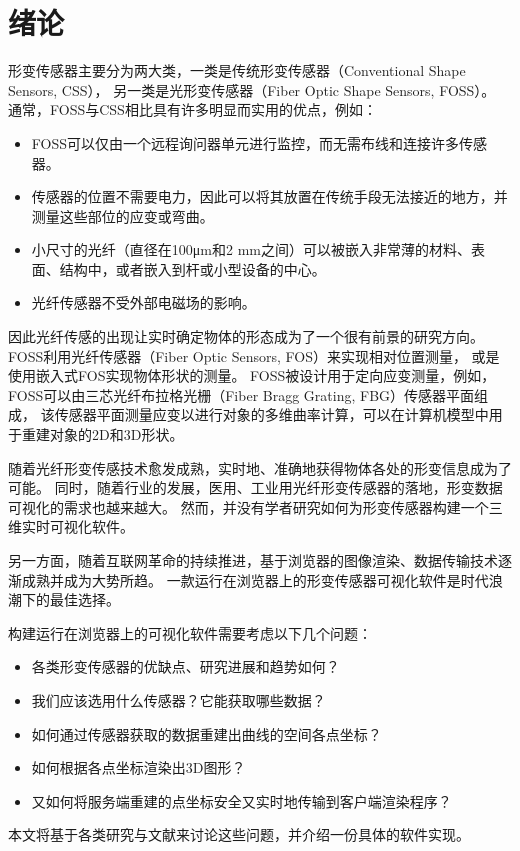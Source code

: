 \cleardoublepage

\section{绪论}

形变传感器主要分为两大类，一类是传统形变传感器（Conventional Shape Sensors, CSS），
另一类是光形变传感器（Fiber Optic Shape Sensors, FOSS）。
通常，FOSS与CSS相比具有许多明显而实用的优点，例如：

\begin{itemize}
\item FOSS可以仅由一个远程询问器单元进行监控，而无需布线和连接许多传感器。
\item 传感器的位置不需要电力，因此可以将其放置在传统手段无法接近的地方，并测量这些部位的应变或弯曲。
\item 小尺寸的光纤（直径在100μm和2 mm之间）可以被嵌入非常薄的材料、表面、结构中，或者嵌入到杆或小型设备的中心。
\item 光纤传感器不受外部电磁场的影响。
\end{itemize}

因此光纤传感的出现让实时确定物体的形态成为了一个很有前景的研究方向。
FOSS利用光纤传感器（Fiber Optic Sensors, FOS）来实现相对位置测量，
或是使用嵌入式FOS实现物体形状的测量。
FOSS被设计用于定向应变测量，例如，
FOSS可以由三芯光纤布拉格光栅（Fiber Bragg Grating, FBG）传感器平面组成，
该传感器平面测量应变以进行对象的多维曲率计算，可以在计算机模型中用于重建对象的2D和3D形状。

随着光纤形变传感技术愈发成熟，实时地、准确地获得物体各处的形变信息成为了可能。
同时，随着行业的发展，医用、工业用光纤形变传感器的落地，形变数据可视化的需求也越来越大。
然而，并没有学者研究如何为形变传感器构建一个三维实时可视化软件。

另一方面，随着互联网革命的持续推进，基于浏览器的图像渲染、数据传输技术逐渐成熟并成为大势所趋。
一款运行在浏览器上的形变传感器可视化软件是时代浪潮下的最佳选择。

构建运行在浏览器上的可视化软件需要考虑以下几个问题：

\begin{itemize}
\item 各类形变传感器的优缺点、研究进展和趋势如何？
\item 我们应该选用什么传感器？它能获取哪些数据？
\item 如何通过传感器获取的数据重建出曲线的空间各点坐标？
\item 如何根据各点坐标渲染出3D图形？
\item 又如何将服务端重建的点坐标安全又实时地传输到客户端渲染程序？
\end{itemize}

本文将基于各类研究与文献来讨论这些问题，并介绍一份具体的软件实现。


